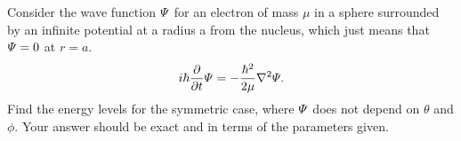 \documentclass[12pt]{report}
\begin{document}
\newpage



\begin{problem}
    Consider the wave function $\varPsi$ for an electron of mass $\mu$ in a sphere surrounded by an infinite potential at a radius a from the nucleus, which just means that $\varPsi = 0$ at $r=a$.
    \[
        i\hbar \frac{\partial }{\partial t}\varPsi = - \frac{\hbar^2}{2\mu}\nabla^2\varPsi.
    \] 
    Find the energy levels for the symmetric case, where $\varPsi$ does not depend on $\theta$ and $\phi$. Your answer should be exact and in terms of the parameters given.
\end{problem}
\end{document}
